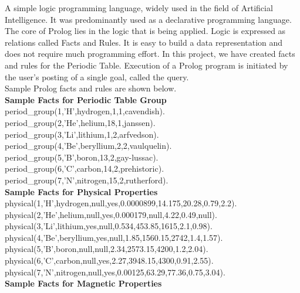 \documentclass{article}
\begin{document}
A simple logic programming language, widely used in the field of Artificial Intelligence. It was predominantly used as a declarative programming language. The core of Prolog lies in the logic that is being applied.\cite{swiprologManual} Logic is expressed as relations called Facts and Rules. It is easy to build a data representation and does not require much programming effort. In this project, we have created facts and rules for the Periodic Table. Execution of a Prolog program is initiated by the user's posting of a single goal, called the query.\\
\newline
Sample Prolog facts and rules are shown below.\\
\newline
\textbf{Sample Facts for Periodic Table Group}\\
\newline
period\_group(1,'H',hydrogen,1,1,cavendish).\\
period\_group(2,'He',helium,18,1,janssen).\\
period\_group(3,'Li',lithium,1,2,arfvedson).\\
period\_group(4,'Be',beryllium,2,2,vaulquelin).\\
period\_group(5,'B',boron,13,2,gay-lussac).\\
period\_group(6,'C',carbon,14,2,prehistoric).\\
period\_group(7,'N',nitrogen,15,2,rutherford).\\
\newline
\textbf{Sample Facts for Physical Properties}\\
\newline
physical(1,'H',hydrogen,null,yes,0.0000899,14.175,20.28,0.79,2.2).\\
physical(2,'He',helium,null,yes,0.000179,null,4.22,0.49,null).\\
physical(3,'Li',lithium,yes,null,0.534,453.85,1615,2.1,0.98).\\
physical(4,'Be',beryllium,yes,null,1.85,1560.15,2742,1.4,1.57).\\
physical(5,'B',boron,null,null,2.34,2573.15,4200,1.2,2.04).\\
physical(6,'C',carbon,null,yes,2.27,3948.15,4300,0.91,2.55).\\
physical(7,'N',nitrogen,null,yes,0.00125,63.29,77.36,0.75,3.04).\\
\newline
\textbf{Sample Facts for Magnetic Properties}\\
\newline
\end{document}
